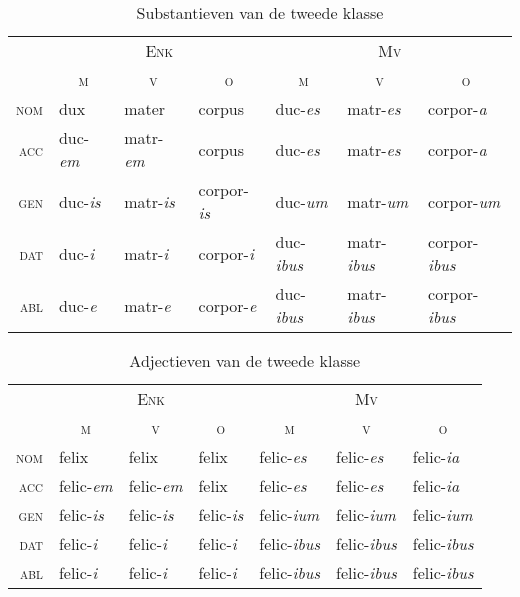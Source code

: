 \documentclass[12pt,a4paper]{article}
\begin{document}
\begin{table}[H]
\centering
\begin{tabular}{ r | l l l | l l l }
\toprule
 & \multicolumn{3}{c|}{\textsc{Enk}} & \multicolumn{3}{c}{\textsc{Mv}} \\
 & \multicolumn{1}{c}{\textsc{m}} & \multicolumn{1}{c}{\textsc{v}} & \multicolumn{1}{c|}{\textsc{o}} & \multicolumn{1}{c}{\textsc{m}} & \multicolumn{1}{c}{\textsc{v}} & \multicolumn{1}{c}{\textsc{o}} \\ 
\midrule
\textsc{nom} & dux            & mater          & corpus           & duc-\emph{es}   & matr-\emph{es}   & corpor-\emph{a}    \\
\textsc{acc} & duc-\emph{em}  & matr-\emph{em} & corpus           & duc-\emph{es}   & matr-\emph{es}   & corpor-\emph{a}    \\
\textsc{gen} & duc-\emph{is}  & matr-\emph{is} & corpor-\emph{is} & duc-\emph{um}   & matr-\emph{um}   & corpor-\emph{um}   \\
\textsc{dat} & duc-\emph{i}   & matr-\emph{i}  & corpor-\emph{i}  & duc-\emph{ibus} & matr-\emph{ibus} & corpor-\emph{ibus} \\
\textsc{abl} & duc-\emph{e}   & matr-\emph{e}  & corpor-\emph{e}  & duc-\emph{ibus} & matr-\emph{ibus} & corpor-\emph{ibus} \\
\bottomrule
\end{tabular}
\caption{Substantieven van de tweede klasse}
\label{tab:subst2}
\end{table}

\begin{table}[H]
\centering
\begin{tabular}{ r | l l l | l l l }
\toprule
 & \multicolumn{3}{c|}{\textsc{Enk}} & \multicolumn{3}{c}{\textsc{Mv}} \\
 & \multicolumn{1}{c}{\textsc{m}} & \multicolumn{1}{c}{\textsc{v}} & \multicolumn{1}{c|}{\textsc{o}} & \multicolumn{1}{c}{\textsc{m}} & \multicolumn{1}{c}{\textsc{v}} & \multicolumn{1}{c}{\textsc{o}} \\ 
\midrule
\textsc{nom} & felix           & felix           & felix           & felic-\emph{es}   & felic-\emph{es}   & felic-\emph{ia}   \\
\textsc{acc} & felic-\emph{em} & felic-\emph{em} & felix           & felic-\emph{es}   & felic-\emph{es}   & felic-\emph{ia}   \\
\textsc{gen} & felic-\emph{is} & felic-\emph{is} & felic-\emph{is} & felic-\emph{ium}  & felic-\emph{ium}  & felic-\emph{ium}  \\
\textsc{dat} & felic-\emph{i}  & felic-\emph{i}  & felic-\emph{i}  & felic-\emph{ibus} & felic-\emph{ibus} & felic-\emph{ibus} \\
\textsc{abl} & felic-\emph{i}  & felic-\emph{i}  & felic-\emph{i}  & felic-\emph{ibus} & felic-\emph{ibus} & felic-\emph{ibus} \\
\bottomrule
\end{tabular}
\caption{Adjectieven van de tweede klasse}
\label{tab:adj2}
\end{table}
\end{document}
